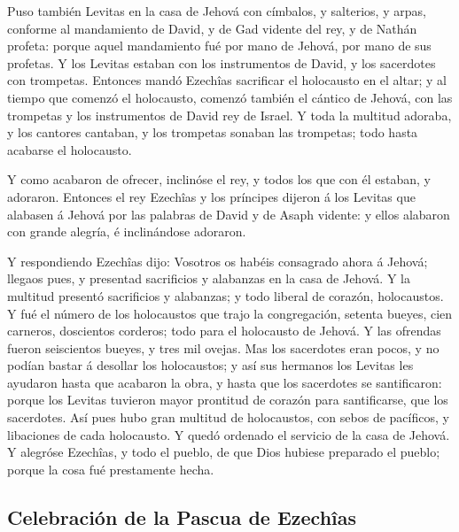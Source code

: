  Puso también Levitas en la casa de Jehová con címbalos,
y salterios, y arpas, conforme al mandamiento de David, y de Gad vidente
del rey, y de Nathán profeta: porque aquel mandamiento fué por mano de
Jehová, por mano de sus profetas.  Y los Levitas estaban
con los instrumentos de David, y los sacerdotes con trompetas.
 Entonces mandó Ezechîas sacrificar el holocausto en el
altar; y al tiempo que comenzó el holocausto, comenzó también el cántico
de Jehová, con las trompetas y los instrumentos de David rey de Israel.
 Y toda la multitud adoraba, y los cantores cantaban, y
los trompetas sonaban las trompetas; todo hasta acabarse el holocausto.

 Y como acabaron de ofrecer, inclinóse el rey, y todos
los que con él estaban, y adoraron.  Entonces el rey
Ezechîas y los príncipes dijeron á los Levitas que alabasen á Jehová por
las palabras de David y de Asaph vidente: y ellos alabaron con grande
alegría, é inclinándose adoraron.

 Y respondiendo Ezechîas dijo: Vosotros os habéis
consagrado ahora á Jehová; llegaos pues, y presentad sacrificios y
alabanzas en la casa de Jehová. Y la multitud presentó sacrificios y
alabanzas; y todo liberal de corazón, holocaustos.  Y fué
el número de los holocaustos que trajo la congregación, setenta bueyes,
cien carneros, doscientos corderos; todo para el holocausto de Jehová.
 Y las ofrendas fueron seiscientos bueyes, y tres mil
ovejas.  Mas los sacerdotes eran pocos, y no podían
bastar á desollar los holocaustos; y así sus hermanos los Levitas les
ayudaron hasta que acabaron la obra, y hasta que los sacerdotes se
santificaron: porque los Levitas tuvieron mayor prontitud de corazón
para santificarse, que los sacerdotes.  Así pues hubo
gran multitud de holocaustos, con sebos de pacíficos, y libaciones de
cada holocausto. Y quedó ordenado el servicio de la casa de Jehová.
 Y alegróse Ezechîas, y todo el pueblo, de que Dios
hubiese preparado el pueblo; porque la cosa fué prestamente hecha.

\hypertarget{celebraciuxf3n-de-la-pascua-de-ezechuxeeas}{%
\subsection{Celebración de la Pascua de
Ezechîas}\label{celebraciuxf3n-de-la-pascua-de-ezechuxeeas}}

